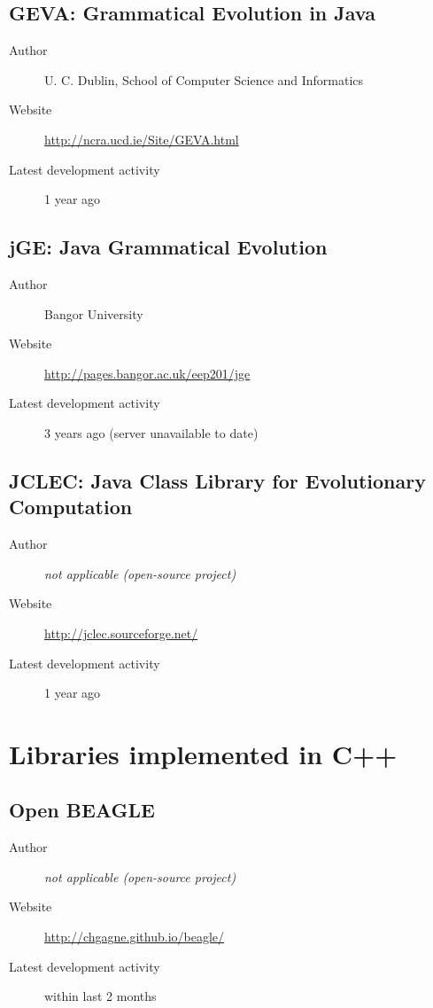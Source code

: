 \subsection*{GEVA: Grammatical Evolution in Java}
\begin{description}
    \item[Author] U. C. Dublin, School of Computer Science and Informatics
    \item[Website] \url{http://ncra.ucd.ie/Site/GEVA.html}
    \item[Latest development activity] 1 year ago
\end{description}


\subsection*{jGE: Java Grammatical Evolution}
\begin{description}
    \item[Author] Bangor University
    \item[Website] \url{http://pages.bangor.ac.uk/eep201/jge}
    \item[Latest development activity] 3 years ago (server unavailable to date)
\end{description}


\subsection*{JCLEC: Java Class Library for Evolutionary Computation}
\begin{description}
    \item[Author] \textit{not applicable (open-source project)}
    \item[Website] \url{http://jclec.sourceforge.net/}
    \item[Latest development activity] 1 year ago
\end{description}


\section{Libraries implemented in C++}
\subsection*{Open BEAGLE}
\begin{description}
    \item[Author] \textit{not applicable (open-source project)}
    \item[Website] \url{http://chgagne.github.io/beagle/}
    \item[Latest development activity] within last 2 months
\end{description}


